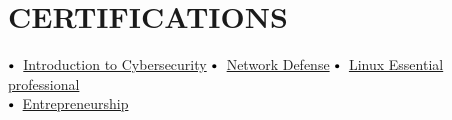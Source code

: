 \documentclass[letterpaper,11pt]{article}
\makeatletter
\newcommand{\resumeItem}[1]{
  \item\small{
    {#1 \vspace{-2pt}}
  }
}
\newcommand{\resumeSubheading}[4]{
  \vspace{-2pt}\item
    \begin{tabular*}{1.0\textwidth}[t]{l@{\extracolsep{\fill}}r}
      \textbf{\large#1} & \textbf{\small #2} \\
      \textit{\large#3} & \textit{\small #4} \\
      
    \end{tabular*}\vspace{-7pt}
}
\newcommand{\resumeSubHeadingListStart}{\begin{itemize}[leftmargin=0.0in, label={}]}
\newcommand{\resumeSubHeadingListEnd}{\end{itemize}}
\newcommand{\resumeItemListStart}{\begin{itemize}}
\newcommand{\resumeItemListEnd}{\end{itemize}\vspace{-5pt}}
\newcommand\sbullet[1][.5]{\mathbin{\vcenter{\hbox{\scalebox{#1}{$\bullet$}}}}}
\makeatother
\begin{document}
 
\section{CERTIFICATIONS}

$\sbullet[.75] \hspace{0.1cm}$ {\href{https://www.credly.com/badges/5f4cbaec-1979-44e5-afb2-48cdfc02e88c?source=linked_in_profile}{Introduction to Cybersecurity}} \hspace{1.6cm}
$\sbullet[.75] \hspace{0.1cm}$ {\href{https://www.credly.com/badges/bebc273f-f36d-4e00-b05c-86109980fc41?source=linked_in_profile}{Network Defense}} \hspace{2.59cm}
$\sbullet[.75] \hspace{0.2cm}${\href{https://drive.google.com/file/d/12UZapdVUGpm6yqO9uifRv2qI9JxOFj_4/view} {Linux Essential professional}}\\

$\sbullet[.75] \hspace{0.2cm}${\href{https://drive.google.com/file/d/1rDtlD_lNX7WtQMjb0_PNIgaQVGKw0I7E/view}{Entrepreneurship}} \hspace{1cm}
\end{document}
